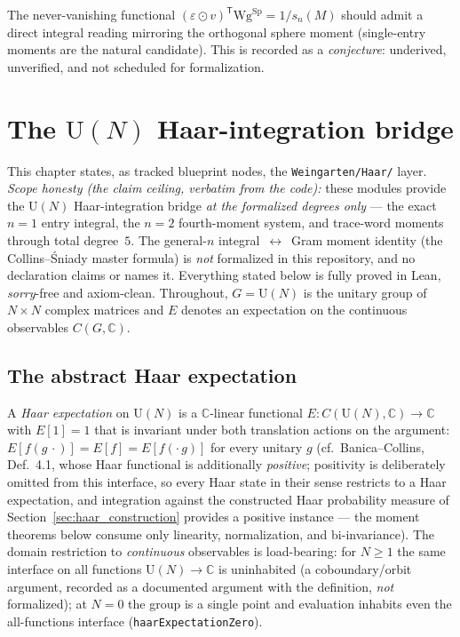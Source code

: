 \begin{remark}\label{rem:eps_det_conj}
The never-vanishing functional
$(\varepsilon\odot v)^{\mathsf T}\mathrm{Wg}^{\mathrm{Sp}} = 1/s_n(M)$
should admit a direct integral reading mirroring the orthogonal sphere
moment (single-entry moments are the natural candidate). This is recorded
as a \emph{conjecture}: underived, unverified, and not scheduled for
formalization.
\end{remark}

\chapter{The \texorpdfstring{$\mathrm U(N)$}{U(N)} Haar-integration bridge}\label{ch:haar}

This chapter states, as tracked blueprint nodes, the
\texttt{Weingarten/Haar/} layer. \emph{Scope honesty
(the claim ceiling, verbatim from the code):} these modules provide the
$\mathrm U(N)$ Haar-integration bridge \emph{at the formalized degrees
only} --- the exact $n=1$ entry integral, the $n=2$ fourth-moment
system, and trace-word moments through total degree~$5$. The
general-$n$ integral~$\leftrightarrow$~Gram moment identity (the
Collins--\'Sniady master formula) is \emph{not} formalized in this
repository, and no declaration claims or names it. Everything stated
below is fully proved in Lean, \emph{sorry}-free and axiom-clean.
Throughout, $G=\mathrm U(N)$ is the unitary group of
$N\times N$ complex matrices and $E$ denotes an expectation on the
continuous observables $C(G,\mathbb C)$.

\section{The abstract Haar expectation}

\begin{definition}\label{def:haar_state}
\leanok
A \emph{Haar expectation} on $\mathrm U(N)$ is a $\mathbb C$-linear
functional $E\colon C(\mathrm U(N),\mathbb C)\to\mathbb C$ with
$E[1]=1$ that is invariant under both translation actions on the
argument: $E[f(g\,\cdot)]=E[f]=E[f(\cdot\,g)]$ for every unitary $g$
(cf.\ Banica--Collins, Def.~4.1, whose Haar functional is additionally
\emph{positive}; positivity is deliberately omitted from this
interface, so every Haar state in their sense restricts to a Haar
expectation, and integration against the constructed Haar probability
measure of Section~\ref{sec:haar_construction} provides a positive
instance --- the moment theorems below consume only linearity,
normalization, and bi-invariance). The domain restriction to
\emph{continuous} observables is load-bearing: for $N\ge1$ the same
interface on all functions $\mathrm U(N)\to\mathbb C$ is uninhabited
(a coboundary/orbit argument, recorded as a documented argument with
the definition, \emph{not} formalized); at $N=0$ the group is a single
point and evaluation inhabits even the all-functions interface
(\texttt{haarExpectationZero}).
\end{definition}

